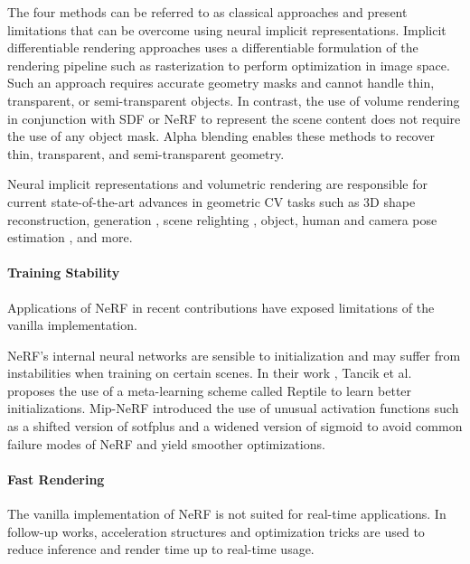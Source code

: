 The four methods can be referred to as classical approaches and present limitations that can be overcome using neural implicit representations. Implicit differentiable rendering approaches  uses a differentiable formulation of the rendering pipeline such as rasterization to perform optimization in image space. Such an approach requires accurate geometry masks and cannot handle thin, transparent, or semi-transparent objects. In contrast, the use of volume rendering in conjunction with \gls{SDF}  or \gls{NeRF}  to represent the scene content does not require the use of any object mask. Alpha blending enables these methods to recover thin, transparent, and semi-transparent geometry.

Neural implicit representations and volumetric rendering are responsible for current state-of-the-art advances in geometric \gls{CV} tasks such as 3D shape reconstruction, generation , scene relighting , object, human and camera pose estimation , and more.

\paragraph{Training Stability}

Applications of \gls{NeRF} in recent contributions have exposed limitations of the vanilla implementation.

\gls{NeRF}'s internal neural networks are sensible to initialization and may suffer from instabilities when training on certain scenes. In their work , Tancik et al. proposes the use of a meta-learning scheme called Reptile  to learn better initializations. Mip-NeRF  introduced the use of unusual activation functions such as a shifted version of sotfplus and a widened version of sigmoid to avoid common failure modes of \gls{NeRF} and yield smoother optimizations.

\paragraph{Fast Rendering}

The vanilla implementation of \gls{NeRF} is not suited for real-time applications. In follow-up works, acceleration structures and optimization tricks are used to reduce inference and render time up to real-time usage.


